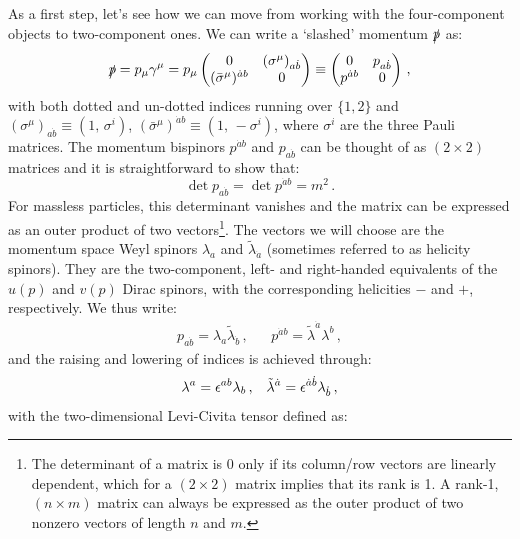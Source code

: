 \documentclass[main.tex]{subfiles}
\begin{document}
As a first step, let's see how we can move from working with the four-component objects to two-component ones. We can write a `slashed' momentum $\slashed{p}$ as:
\begin{equation} \label{eq:pslashed1}
    \slashed{p} = p_\mu \gamma^\mu = p_\mu
    \begin{pmatrix}
    0 & (\sigma^\mu)_{a\dot{b}} \\
    (\bar{\sigma}^\mu)^{\dot{a}b} & 0
    \end{pmatrix}
    \equiv
    \begin{pmatrix}
    0 & p_{a\dot{b}} \\
    p^{\dot{a}b} & 0 
    \end{pmatrix} \, ,
\end{equation}
with both dotted and un-dotted indices running over $\{1,2\}$ and $(\sigma^\mu)_{a\dot{b}} \equiv (1, \, \sigma^i)$, $(\bar{\sigma}^\mu)^{\dot{a}b} \equiv (1, \, -\sigma^i)$, where $\sigma^i$ are the three Pauli matrices. The momentum bispinors $p^{\dot{a}b}$ and $p_{a\dot{b}}$ can be thought of as $(2 \times 2)$ matrices and it is straightforward to show that:
\begin{equation}
    \det p_{a\dot{b}} = \det p^{\dot{a}b} = m^2\,.
\end{equation}
For massless particles, this determinant vanishes and the matrix can be expressed as an outer product of two vectors\footnote{The determinant of a matrix is 0 only if its column/row vectors are linearly dependent, which for a $(2 \times 2)$ matrix implies that its rank is 1. A rank-1, $(n \times m)$ matrix can always be expressed as the outer product of two nonzero vectors of length $n$ and $m$.}. The vectors we will choose are the momentum space Weyl spinors $\lambda_a$  and $\tilde{\lambda}_{\dot{a}}$ (sometimes referred to as helicity spinors). They are the two-component, left- and right-handed equivalents of the $u(p)$ and $v(p)$ Dirac spinors, with the corresponding helicities $-$ and $+$, respectively. We thus write:
\begin{align} \label{eq:outerproduct}
    p_{a\dot{b}} = \lambda_a \tilde{\lambda}_{\dot{b}}\,, && p^{\dot{a}b} = \tilde{\lambda}^{\dot{a}} \lambda^b\,,
\end{align}
and the raising and lowering of indices is achieved through:
\begin{align}
    \lambda^a = \epsilon^{ab} \lambda_b\,, && \tilde{\lambda}^{\dot{a}} = \epsilon^{\dot{a}\dot{b}} \lambda_{\dot{b}} \,,
\end{align}
with the two-dimensional Levi-Civita tensor defined as:
\end{document}
